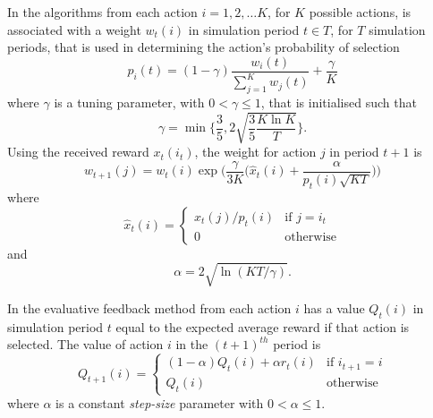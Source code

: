 In the algorithms from  each action $i = 1,2,\dotsc K$, for $K$
possible actions, is associated with a weight $w_t(i)$ in simulation period $t
\in T$, for $T$ simulation periods, that is used in
determining the action's probability of selection
\begin{equation}
p_i(t) = (1 - \gamma) \frac{w_i(t)}{\sum_{j=1}^K w_j(t)} + \frac{\gamma}{K}
\end{equation}
where $\gamma$ is a tuning parameter, with $0 < \gamma \leq 1$, that is
initialised such that
\begin{equation}
\gamma = \min \Biggl\lbrace \frac{3}{5}, 2\sqrt{\frac{3}{5} \frac{K\ln K}{T}}
\Biggr\rbrace .
\end{equation}
Using the received reward $x_t(i_t)$, the weight for action $j$ in period
$t+1$ is
\begin{equation}
w_{t+1}(j) = w_t(i) \exp \biggl(\frac{\gamma}{3K} \biggl(\hat{x}_t(i) +
\frac{\alpha}{p_t(i)\sqrt{KT}}\biggr)\biggr)
\end{equation}
where
\begin{equation}
\hat{x}_t(i) =
\begin{cases}
x_t(j)/p_t(i)& \text{if $j=i_t$}\\
0& \text{otherwise}
\end{cases}\end{equation}
and
\begin{equation}
\alpha = 2\sqrt{\ln(KT/\gamma)}.
\end{equation}

In the evaluative feedback method from  each action
$i$ has a value $Q_t(i)$ in simulation period $t$ equal to the expected average
reward if that action is selected.
The value of
action $i$ in the $(t+1)^{th}$ period is
\begin{equation}
Q_{t+1}(i) = \begin{cases}
(1-\alpha)Q_t(i) + \alpha r_t(i) & \text{if $i_{t+1}=i$}\\
Q_t(i) & \text{otherwise}
\end{cases}
\end{equation}
where $\alpha$ is a constant \textit{step-size} parameter with $0 < \alpha
\leq 1$.

